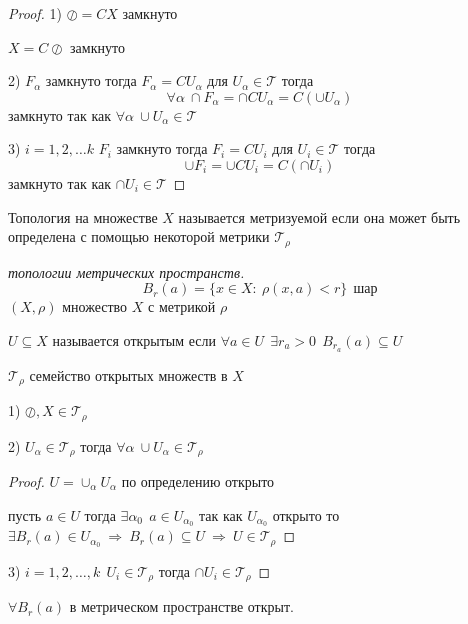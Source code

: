\begin{proof}
  1) $\oslash = CX$ замкнуто

  $X = C \oslash$ замкнуто

  2) $F_{\alpha}$ замкнуто тогда $F_{\alpha} = CU_{\alpha}$ для
  $U_{\alpha} \in \mathcal{T}$ тогда
  $$
  \forall \alpha ~ \cap F_{\alpha} = \cap CU_{\alpha} = C(\cup U_{\alpha})
  $$
  замкнуто так как $\forall \alpha ~ \cup U_{\alpha} \in \mathcal{T}$

  3) $i = 1,2, \ldots k$ $F_i$ замкнуто тогда $F_i = CU_i$ для $U_i \in
  \mathcal{T}$ тогда
  $$
  \cup F_i = \cup CU_i = C(\cap U_i)
  $$
  замкнуто так как $\cap U_i \in \mathcal{T}$
\end{proof}

\begin{define}
  Топология на множестве $X$ называется метризуемой если она может быть
  определена с помощью некоторой метрики $\mathcal{T_{\rho}}$
\end{define}

\begin{proof}[топологии метрических пространств]
  $$
  B_r(a) = \{x \in X : ~ \rho(x,a) < r\} ~~ \text{шар}
  $$
  $(X,\rho)$ множество $X$ с метрикой $\rho$

  $U \subseteq X$ называется открытым если $\forall a \in U ~~ \exists r_a > 0
   ~~ B_{r_a}(a) \subseteq U$

  $\mathcal{T}_{\rho}$ семейство открытых множеств в $X$

  1) $\oslash, X \in \mathcal{T}_{\rho}$

  2) $U_{\alpha} \in \mathcal{T}_{\rho}$ тогда $\forall \alpha ~ \cup U_{\alpha}
  \in \mathcal{T}_{\rho}$

  \begin{proof}
    $U = \cup_{\alpha} U_{\alpha}$ по определению открыто

    пусть $a \in U$ тогда $\exists \alpha_0 ~~
    a \in U_{\alpha_0}$ так как $U_{\alpha_0}$ открыто то $\exists B_r(a) \in
    U_{\alpha_0} ~ \Rightarrow ~ B_r (a) \subseteq U ~ \Rightarrow ~
    U \in \mathcal{T}_{\rho}$
  \end{proof}

  3) $i = 1,2,\ldots, k ~~ U_i \in \mathcal{T}_{\rho}$ тогда $\cap U_i \in
  \mathcal{T}_{\rho}$
\end{proof}

\begin{theorem}
  $\forall B_r(a)$ в метрическом пространстве открыт.
\end{theorem}

